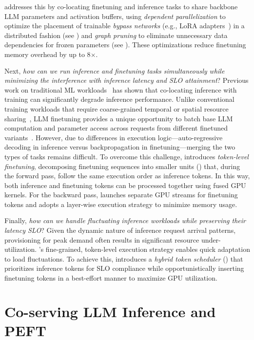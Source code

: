 \FlexLLM addresses this by co-locating finetuning and inference tasks to share backbone LLM parameters and activation buffers, using {\em dependent parallelization} to optimize the placement of trainable {\em bypass networks} (e.g., LoRA adapters~\cite{hu2021lora}) in a distributed fashion (see ) and {\em graph pruning} to eliminate unnecessary data dependencies for frozen parameters (see ). These optimizations reduce finetuning memory overhead by up to 8$\times$.

Next, \emph{how can we run inference and finetuning tasks simultaneously while minimizing the interference with inference latency and SLO attainment}?
Previous work on traditional ML workloads~\cite{romero2021infaas} has shown that co-locating inference with training can significantly degrade inference performance.
Unlike conventional training workloads that require coarse-grained temporal or spatial resource sharing~\cite{choi2022serving}, LLM finetuning provides a unique opportunity to batch base LLM computation and parameter access across requests from different finetuned variants~\cite{wu2024dlora}. However, due to differences in execution logic---auto-regressive decoding in inference versus backpropagation in finetuning---merging the two types of tasks remains difficult.
%
To overcome this challenge, \FlexLLM introduces {\em token-level finetuning}, decomposing finetuning sequences into smaller units () that, during the forward pass, follow the same execution order as inference tokens. In this way, both inference and finetuning tokens can be processed together using fused GPU kernels. For the backward pass, \FlexLLM launches separate GPU streams for finetuning tokens and adopts a layer-wise execution strategy to minimize memory usage.

Finally, \emph{how can we handle fluctuating inference workloads while preserving their latency SLO}?
%
Given the dynamic nature of inference request arrival patterns, provisioning for peak demand often results in significant resource under-utilization.
\FlexLLM's fine-grained, token-level execution strategy enables quick adaptation to load fluctuations.
To achieve this, \FlexLLM introduces a {\em hybrid token scheduler} () that prioritizes inference tokens for SLO compliance while opportunistically inserting finetuning tokens in a best-effort manner to maximize GPU utilization.

\section{Co-serving LLM Inference and PEFT}
\label{flexllm:sec:coserving}

